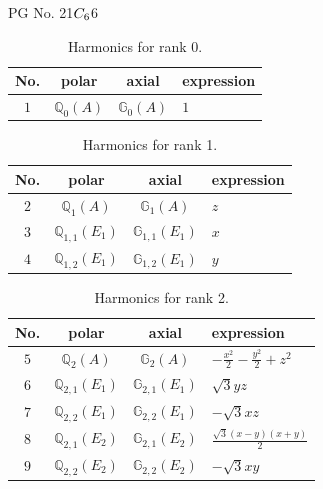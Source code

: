 \documentclass[fleqn,8pt,landscape]{jsarticle}
\begin{document}
\setcounter{MaxMatrixCols}{32}

\renewcommand{\tablename}{Table~}
\renewcommand{\figurename}{Figure~}
\begin{center}
\LARGE
PG No. 21\quad$C_{\rm 6}$\quad$6$\quad[ hexagonal ]
\end{center}
\begin{table}[ht!]
\begin{center}
\caption{Harmonics for rank 0.}
\renewcommand{\arraystretch}{1.3}
\begin{tabular}{cccl} \hline \hline
No. & polar & axial & expression \\ \hline
$ 1 $ & $ \mathbb{Q}_{0}(A) $ & $ \mathbb{G}_{0}(A) $ & $ 1 $ \\
 \hline \hline
\end{tabular}
\end{center}
\end{table}
\begin{table}[ht!]
\begin{center}
\caption{Harmonics for rank 1.}
\renewcommand{\arraystretch}{1.3}
\begin{tabular}{cccl} \hline \hline
No. & polar & axial & expression \\ \hline
$ 2 $ & $ \mathbb{Q}_{1}(A) $ & $ \mathbb{G}_{1}(A) $ & $ z $ \\
$ 3 $ & $ \mathbb{Q}_{1,1}(E_{1}) $ & $ \mathbb{G}_{1,1}(E_{1}) $ & $ x $ \\
$ 4 $ & $ \mathbb{Q}_{1,2}(E_{1}) $ & $ \mathbb{G}_{1,2}(E_{1}) $ & $ y $ \\
 \hline \hline
\end{tabular}
\end{center}
\end{table}
\begin{table}[ht!]
\begin{center}
\caption{Harmonics for rank 2.}
\renewcommand{\arraystretch}{1.3}
\begin{tabular}{cccl} \hline \hline
No. & polar & axial & expression \\ \hline
$ 5 $ & $ \mathbb{Q}_{2}(A) $ & $ \mathbb{G}_{2}(A) $ & $ - \frac{x^{2}}{2} - \frac{y^{2}}{2} + z^{2} $ \\
$ 6 $ & $ \mathbb{Q}_{2,1}(E_{1}) $ & $ \mathbb{G}_{2,1}(E_{1}) $ & $ \sqrt{3} y z $ \\
$ 7 $ & $ \mathbb{Q}_{2,2}(E_{1}) $ & $ \mathbb{G}_{2,2}(E_{1}) $ & $ - \sqrt{3} x z $ \\
$ 8 $ & $ \mathbb{Q}_{2,1}(E_{2}) $ & $ \mathbb{G}_{2,1}(E_{2}) $ & $ \frac{\sqrt{3} \left(x - y\right) \left(x + y\right)}{2} $ \\
$ 9 $ & $ \mathbb{Q}_{2,2}(E_{2}) $ & $ \mathbb{G}_{2,2}(E_{2}) $ & $ - \sqrt{3} x y $ \\
 \hline \hline
\end{tabular}
\end{center}
\end{table}
\end{document}
